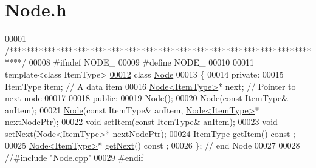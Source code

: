 \hypertarget{Node_8h_source}{}\section{Node.\+h}

\begin{DoxyCode}
00001 \textcolor{comment}{/***************************************************************************/}
00008 \textcolor{preprocessor}{#ifndef NODE\_}
00009 \textcolor{preprocessor}{#define NODE\_}
00010 
00011 \textcolor{keyword}{template}<\textcolor{keyword}{class} ItemType>
\hyperlink{classNode}{00012} \textcolor{keyword}{class }\hyperlink{classNode}{Node}
00013 \{
00014 \textcolor{keyword}{private}:
00015    ItemType        item; \textcolor{comment}{// A data item}
00016    \hyperlink{classNode}{Node<ItemType>}* next; \textcolor{comment}{// Pointer to next node}
00017    
00018 \textcolor{keyword}{public}:      
00019    \hyperlink{classNode_a627e94f4fba0e73c546e0fb2a7266f36}{Node}();
00020    \hyperlink{classNode_a627e94f4fba0e73c546e0fb2a7266f36}{Node}(\textcolor{keyword}{const} ItemType& anItem);
00021    \hyperlink{classNode_a627e94f4fba0e73c546e0fb2a7266f36}{Node}(\textcolor{keyword}{const} ItemType& anItem, \hyperlink{classNode}{Node<ItemType>}* nextNodePtr);
00022    \textcolor{keywordtype}{void} \hyperlink{classNode_ab4ceecdecc5df799011de486b9f54974}{setItem}(\textcolor{keyword}{const} ItemType& anItem);
00023    \textcolor{keywordtype}{void} \hyperlink{classNode_a01c1a66d4e39f5b149e090413deb4633}{setNext}(\hyperlink{classNode}{Node<ItemType>}* nextNodePtr);
00024    ItemType \hyperlink{classNode_a6c08caef312b6f2f69b5e090cf047514}{getItem}() \textcolor{keyword}{const} ;
00025    \hyperlink{classNode}{Node<ItemType>}* \hyperlink{classNode_a3eb0c96e03a3fd46ea1cff4c305bbedd}{getNext}() \textcolor{keyword}{const} ;
00026 \}; \textcolor{comment}{// end Node}
00027 
00028 \textcolor{comment}{//#include "Node.cpp"}
00029 \textcolor{preprocessor}{#endif}
\end{DoxyCode}
